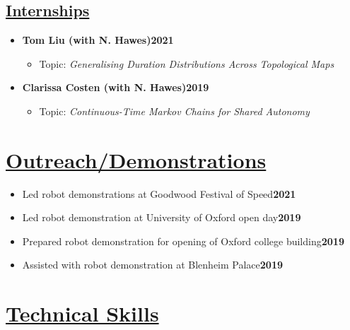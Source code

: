 \documentclass[11pt]{article}
\begin{document}
\subsection*{\underline{Internships}}	
\begin{itemize}
\item \textbf{Tom Liu (with N. Hawes)\hfill 2021}
\begin{itemize}
\item Topic: \emph{Generalising Duration Distributions Across Topological Maps}
\end{itemize}
\item \textbf{Clarissa Costen (with N. Hawes)\hfill 2019}
\begin{itemize}
\item Topic: \emph{Continuous-Time Markov Chains for Shared Autonomy}
\end{itemize}
\end{itemize}

\section*{\underline{Outreach/Demonstrations}}
\begin{itemize}
\item Led robot demonstrations at Goodwood Festival of Speed\hfill \textbf{2021}
\item Led robot demonstration at University of Oxford open day\hfill \textbf{2019}
\item Prepared robot demonstration for opening of Oxford college building\hfill \textbf{2019}
\item Assisted with robot demonstration at Blenheim Palace\hfill \textbf{2019}
\end{itemize}


\iffalse
	\section*{\underline{Technical Skills}}
\end{document}
